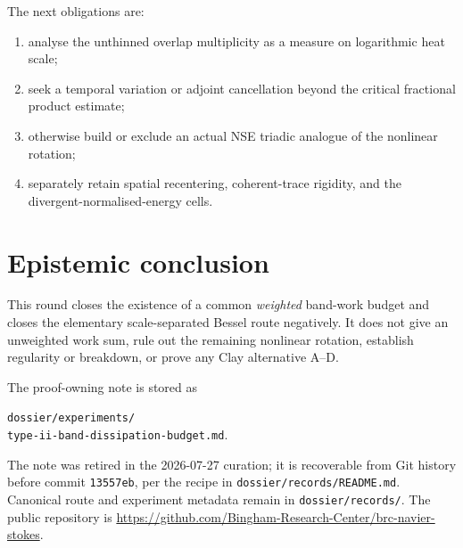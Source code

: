 \documentclass[11pt]{article}
\theoremstyle{remark}
\begin{document}
The next obligations are:
\begin{enumerate}
\item analyse the unthinned overlap multiplicity as a measure on logarithmic
heat scale;
\item seek a temporal variation or adjoint cancellation beyond the critical
fractional product estimate;
\item otherwise build or exclude an actual NSE triadic analogue of the
nonlinear rotation;
\item separately retain spatial recentering, coherent-trace rigidity, and
the divergent-normalised-energy cells.
\end{enumerate}

\section{Epistemic conclusion}

This round closes the existence of a common \emph{weighted} band-work
budget and closes the elementary scale-separated Bessel route negatively.
It does not give an unweighted work sum, rule out the remaining nonlinear
rotation, establish regularity or breakdown, or prove any Clay alternative
A--D.

The proof-owning note is stored as
\begin{center}
\small
\texttt{dossier/experiments/}\\
\texttt{type-ii-band-dissipation-budget.md}.
\end{center}
The note was retired in the 2026-07-27 curation; it is recoverable from
Git history before commit \texttt{13557eb}, per the recipe in
\texttt{dossier/records/README.md}.
Canonical route and experiment metadata remain in
\texttt{dossier/records/}.  The public repository is
\url{https://github.com/Bingham-Research-Center/brc-navier-stokes}.
\end{document}
